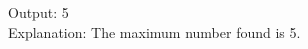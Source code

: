 \documentclass[preview]{standalone}
\begin{document}
Output: 5\\Explanation: The maximum number found is 5.\\
\end{document}
